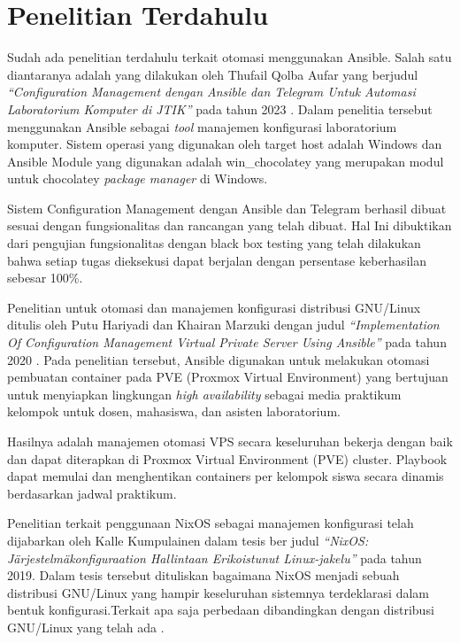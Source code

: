\documentclass[10pt,twoside]{report}
\begin{document}
\section{Penelitian Terdahulu}
\begin{adjustwidth}{0.70cm}{}
	\vspace{-3mm}
	\hspace\parindent
	Sudah ada penelitian terdahulu terkait otomasi menggunakan Ansible. Salah
	satu diantaranya adalah yang dilakukan oleh Thufail Qolba Aufar yang
	berjudul \textit{“Configuration Management dengan Ansible dan Telegram Untuk
		Automasi Laboratorium Komputer di JTIK”} pada tahun 2023 \parencite{thufail23}. Dalam penelitia
	tersebut menggunakan Ansible sebagai \textit{tool} manajemen konfigurasi
	laboratorium komputer. Sistem operasi yang digunakan oleh target host
	adalah Windows dan Ansible Module yang digunakan adalah win\_chocolatey yang
	merupakan modul untuk chocolatey \textit{package manager} di Windows.

	Sistem Configuration Management dengan Ansible dan Telegram berhasil dibuat
	sesuai dengan fungsionalitas dan rancangan yang telah dibuat. Hal Ini
	dibuktikan dari pengujian fungsionalitas dengan black box testing yang telah
	dilakukan bahwa setiap tugas dieksekusi dapat berjalan dengan persentase
	keberhasilan sebesar 100\%.

	Penelitian untuk otomasi dan manajemen konfigurasi distribusi GNU/Linux
	ditulis oleh Putu Hariyadi dan Khairan Marzuki dengan judul \textit{“Implementation
		Of Configuration Management Virtual Private Server Using Ansible”} pada
	tahun 2020 \parencite{hariyadi2020}. Pada penelitian tersebut, Ansible digunakan untuk melakukan
	otomasi pembuatan container pada PVE (Proxmox Virtual Environment) yang
	bertujuan untuk menyiapkan lingkungan \textit{high availability} sebagai media
	praktikum kelompok untuk dosen, mahasiswa, dan asisten laboratorium.

	Hasilnya adalah manajemen otomasi VPS secara keseluruhan bekerja dengan baik
	dan dapat diterapkan di Proxmox Virtual Environment (PVE) cluster. Playbook
	dapat memulai dan menghentikan containers per kelompok siswa secara dinamis
	berdasarkan jadwal praktikum.

	Penelitian terkait penggunaan NixOS sebagai manajemen konfigurasi telah
	dijabarkan oleh Kalle Kumpulainen dalam tesis ber judul \textit{“NixOS:
		Järjestelmäkonfiguraation Hallintaan Erikoistunut Linux-jakelu”} pada tahun
	2019. Dalam tesis tersebut dituliskan bagaimana NixOS menjadi sebuah
	distribusi GNU/Linux yang hampir keseluruhan sistemnya terdeklarasi dalam
	bentuk konfigurasi.Terkait apa saja perbedaan dibandingkan dengan
	distribusi GNU/Linux yang telah ada \parencite{kumpulainen_2019_nixos}.


\end{adjustwidth}
\end{document}
